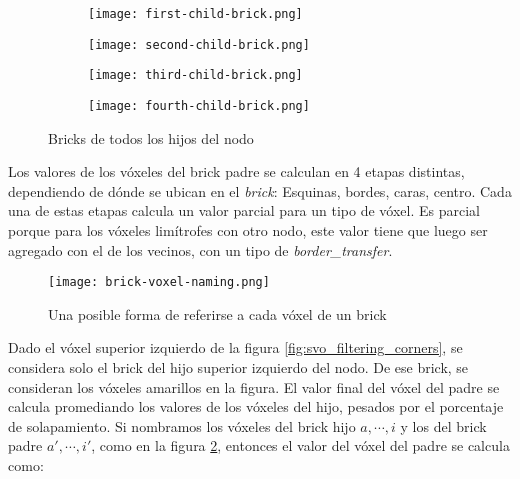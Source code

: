 \begin{figure}[h!]
    \begin{center}
        \begin{subfigure}{.24\textwidth}
            \texttt{[image: first-child-brick.png]}
        \end{subfigure}
        \begin{subfigure}{.24\textwidth}
            \texttt{[image: second-child-brick.png]}
        \end{subfigure}
        \begin{subfigure}{.24\textwidth}
            \texttt{[image: third-child-brick.png]}
        \end{subfigure}
        \begin{subfigure}{.24\textwidth}
            \texttt{[image: fourth-child-brick.png]}
        \end{subfigure}
    \end{center}
    \caption{Bricks de todos los hijos del nodo}
    \label{fig:all_child_bricks}
\end{figure}

Los valores de los vóxeles del brick padre se calculan en 4 etapas distintas, dependiendo de dónde se ubican en el \textit{brick}: Esquinas, bordes, caras, centro.
Cada una de estas etapas calcula un valor parcial para un tipo de vóxel.
Es parcial porque para los vóxeles limítrofes con otro nodo, este valor tiene que luego ser agregado con el de los vecinos, con un tipo de \textit{border\_transfer}.


\begin{figure}
    \centering
    \texttt{[image: brick-voxel-naming.png]}
    \caption{Una posible forma de referirse a cada vóxel de un brick}
    \label{fig:brick-voxel-naming}
\end{figure}

Dado el vóxel superior izquierdo de la figura \ref{fig:svo_filtering_corners}, se considera solo el brick del hijo superior izquierdo del nodo.
De ese brick, se consideran los vóxeles amarillos en la figura.
El valor final del vóxel del padre se calcula promediando los valores de los vóxeles del hijo, pesados por el porcentaje de solapamiento.
Si nombramos los vóxeles del brick hijo $a, \cdots, i$ y los del brick padre $a', \cdots, i'$, como en la figura \ref{fig:brick-voxel-naming}, entonces el valor del vóxel del padre se calcula como:

